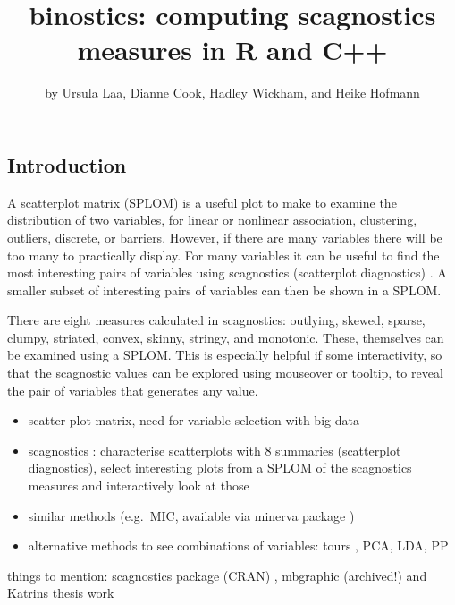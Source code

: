 \title{binostics: computing scagnostics measures in R and C++}
\author{by Ursula Laa, Dianne Cook, Hadley Wickham, and Heike Hofmann}

\maketitle


\hypertarget{introduction}{%
\subsection{Introduction}\label{introduction}}

A scatterplot matrix (SPLOM) is a useful plot to make to examine the
distribution of two variables, for linear or nonlinear association,
clustering, outliers, discrete, or barriers. However, if there are many
variables there will be too many to practically display. For many
variables it can be useful to find the most interesting pairs of
variables using scagnostics (scatterplot diagnostics)
\citep[\citet{WW08}]{scag}. A smaller subset of interesting pairs of
variables can then be shown in a SPLOM.

There are eight measures calculated in scagnostics: outlying, skewed,
sparse, clumpy, striated, convex, skinny, stringy, and monotonic. These,
themselves can be examined using a SPLOM. This is especially helpful if
some interactivity, so that the scagnostic values can be explored using
mouseover or tooltip, to reveal the pair of variables that generates any
value.

\begin{itemize}
\tightlist
\item
  scatter plot matrix, need for variable selection with big data
\item
  scagnostics \citep[\citet{WW08}]{scag}: characterise scatterplots with
  8 summaries (scatterplot diagnostics), select interesting plots from a
  SPLOM of the scagnostics measures and interactively look at those
\item
  similar methods (e.g.~MIC\citep{Reshef1518}, available via minerva
  package \citep{minerva})
\item
  alternative methods to see combinations of variables: tours
  \citep[\citet{tourr}]{As85}, PCA, LDA, PP \citep{f87}
\end{itemize}

things to mention: scagnostics package (CRAN) \citep{LWscagR}, mbgraphic
\citep{mbgraphic} (archived!) and Katrins thesis work \citep{Grimm2016}

